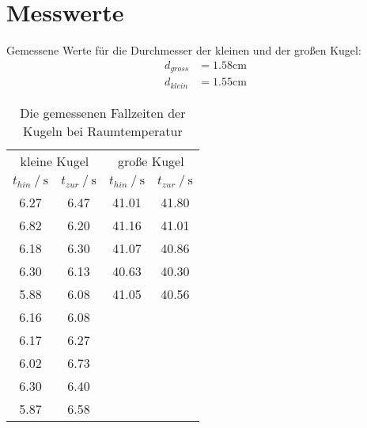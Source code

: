 \section{Messwerte}
\label{sec:Messwerte}

Gemessene Werte für die Durchmesser der kleinen und der großen Kugel:
\begin{align*}
    d_{gross} &= 1.58\unit{\centi\meter}\\
    d_{klein} &= 1.55\unit{\centi\meter}
\end{align*}

\begin{table}
    \centering
    \caption{Die gemessenen Fallzeiten der Kugeln bei Raumtemperatur}
    \begin{tabular}{cccc}
      \toprule
      \multicolumn{2}{c}{kleine Kugel} & \multicolumn{2}{c}{große Kugel} \\
      \cmidrule(lr){1-2} \cmidrule(lr){3-4}
      {$t_{hin} \mathbin{/} \unit{\second}$} &
      {$t_{zur} \mathbin{/} \unit{\second}$} &
      {$t_{hin} \mathbin{/} \unit{\second}$} &
      {$t_{zur} \mathbin{/} \unit{\second}$} \\
      \midrule
        6.27 & 6.47 & 41.01 & 41.80 \\
        6.82 & 6.20 & 41.16 & 41.01 \\
        6.18 & 6.30 & 41.07 & 40.86 \\
        6.30 & 6.13 & 40.63 & 40.30 \\
        5.88 & 6.08 & 41.05 & 40.56 \\
        6.16 & 6.08 \\
        6.17 & 6.27 \\
        6.02 & 6.73 \\
        6.30 & 6.40 \\
        5.87 & 6.58 \\
      \bottomrule
    \end{tabular}
    \label{tab:Tabelle1}
\end{table}

